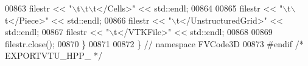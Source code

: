 \begin{DoxyCode}
00863     filestr << \textcolor{stringliteral}{"\(\backslash\)t\(\backslash\)t\(\backslash\)t</Cells>"} << std::endl;
00864 
00865     filestr << \textcolor{stringliteral}{"\(\backslash\)t\(\backslash\)t</Piece>"} << std::endl;
00866     filestr << \textcolor{stringliteral}{"\(\backslash\)t</UnstructuredGrid>"} << std::endl;
00867     filestr << \textcolor{stringliteral}{"\(\backslash\)t</VTKFile>"} << std::endl;
00868 
00869     filestr.close();
00870 \}
00871 
00872 \} \textcolor{comment}{// namespace FVCode3D}
00873 \textcolor{preprocessor}{#endif }\textcolor{comment}{/* EXPORTVTU\_HPP\_ */}\textcolor{preprocessor}{}
\end{DoxyCode}
